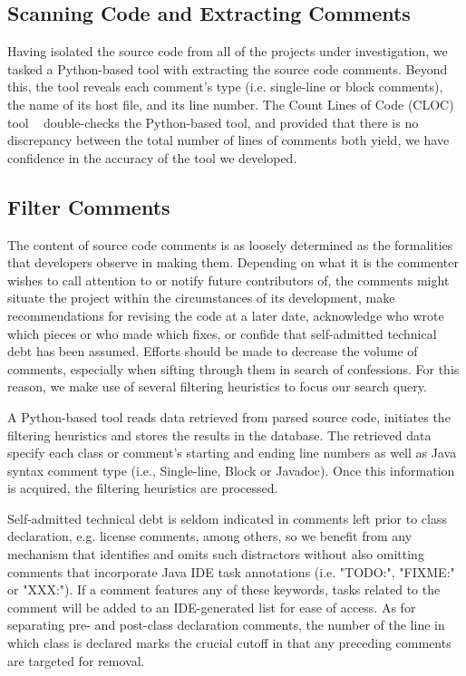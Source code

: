 \subsection{Scanning Code and Extracting Comments}

Having isolated the source code from all of the projects under investigation, we tasked a Python-based tool with extracting the source code comments. Beyond this, the tool reveals each comment's type (i.e. single-line or block comments), the name of its host file, and its line number. The Count Lines of Code (CLOC) tool ~\cite{cloc} double-checks the Python-based tool, and provided that there is no discrepancy between the total number of lines of comments both yield, we have confidence in the accuracy of the tool we developed.

\subsection{Filter Comments}


The content of source code comments is as loosely determined as the formalities that developers observe in making them. Depending on what it is the commenter wishes to call attention to or notify future contributors of, the comments might situate the project within the circumstances of its development, make recommendations for revising the code at a later date, acknowledge who wrote which pieces or who made which fixes, or confide that self-admitted technical debt has been assumed. Efforts should be made to decrease the volume of comments, especially when sifting through them in search of \SATD confessions. For this reason, we make use of several filtering heuristics to focus our search query.\par

A Python-based tool reads data retrieved from parsed source code, initiates the filtering heuristics and stores the results in the database. The retrieved data specify each class or comment's starting and ending line numbers as well as Java syntax comment type (i.e., Single-line, Block or Javadoc). Once this information is acquired, the filtering heuristics are processed. \par

Self-admitted technical debt is seldom indicated in comments left prior to class declaration, e.g. license comments, among others, so we benefit from any mechanism that identifies and omits such distractors without also omitting comments that incorporate Java IDE task annotations (i.e. "TODO:", "FIXME:" or "XXX:"). If a comment features any of these keywords, tasks related to the comment will be added to an IDE-generated list for ease of access. As for separating pre- and post-class declaration comments, the number of the line in which class is declared marks the crucial cutoff in that any preceding comments are targeted for removal.\par

